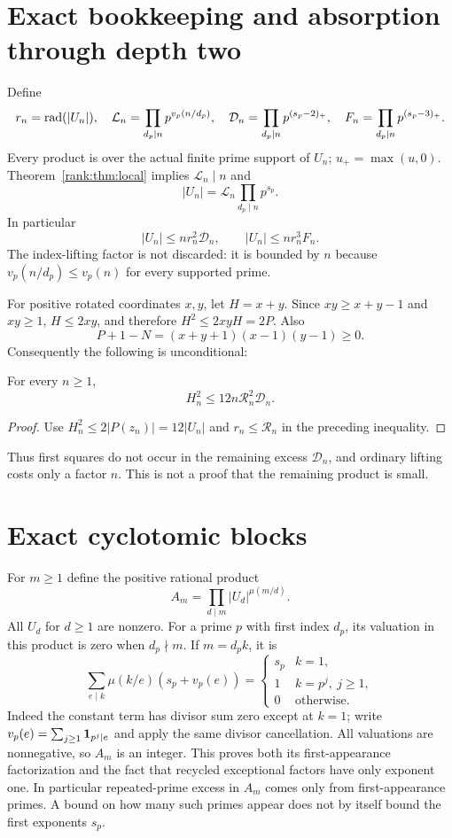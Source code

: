 \section{Exact bookkeeping and absorption through depth two}
Define
\[
 r_n=\operatorname{rad}(|U_n|),\quad
 \mathcal L_n=\prod_{d_p\mid n}p^{v_p(n/d_p)},\quad
 \mathcal D_n=\prod_{d_p\mid n}p^{(s_p-2)_+},\quad
 F_n=\prod_{d_p\mid n}p^{(s_p-3)_+}.
\]
Every product is over the actual finite prime support of $U_n$; $u_+=\max(u,0)$. Theorem~\ref{rank:thm:local} implies $\mathcal L_n\mid n$ and
\[
 |U_n|=\mathcal L_n\prod_{d_p\mid n}p^{s_p}.
\]
In particular
\[
 |U_n|\le n r_n^2\mathcal D_n,\qquad
 |U_n|\le n r_n^3 F_n.
\]
The index-lifting factor is not discarded: it is bounded by $n$ because $v_p(n/d_p)\le v_p(n)$ for every supported prime.

For positive rotated coordinates $x,y$, let $H=x+y$. Since $xy\ge x+y-1$ and $xy\ge1$, $H\le2xy$, and therefore $H^2\le2xyH=2P$. Also
\[
 P+1-N=(x+y+1)(x-1)(y-1)\ge0.
\]
Consequently the following is unconditional:
\begin{theorem}\label{rank:thm:two}
For every $n\ge1$,
\[
 H_n^2\le12n\mathscr R_n^2\mathcal D_n.
\]
\end{theorem}
\begin{proof}
Use $H_n^2\le2|P(z_n)|=12|U_n|$ and $r_n\le\mathscr R_n$ in the preceding inequality.
\end{proof}
Thus first squares do not occur in the remaining excess $\mathcal D_n$, and ordinary lifting costs only a factor $n$. This is not a proof that the remaining product is small.

\section{Exact cyclotomic blocks}
For $m\ge1$ define the positive rational product
\[
 A_m=\prod_{d\mid m}|U_d|^{\mu(m/d)}.
\]
All $U_d$ for $d\ge1$ are nonzero. For a prime $p$ with first index $d_p$, its valuation in this product is zero when $d_p\nmid m$. If $m=d_p k$, it is
\[
 \sum_{e\mid k}\mu(k/e)(s_p+v_p(e))
 =\begin{cases}s_p&k=1,\\1&k=p^j,\ j\ge1,\\0&\text{otherwise}.\end{cases}
\]
Indeed the constant term has divisor sum zero except at $k=1$; write $v_p(e)=\sum_{j\ge1}{\bf1}_{p^j\mid e}$ and apply the same divisor cancellation. All valuations are nonnegative, so $A_m$ is an integer. This proves both its first-appearance factorization and the fact that recycled exceptional factors have only exponent one. In particular repeated-prime excess in $A_m$ comes only from first-appearance primes. A bound on how many such primes appear does not by itself bound the first exponents $s_p$.

